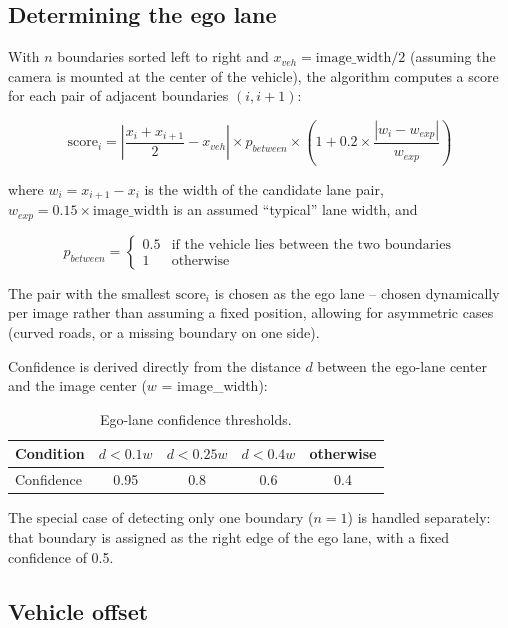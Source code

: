 \documentclass[12pt,a4paper]{report}
\begin{document}
\subsection{Determining the ego lane}

With $n$ boundaries sorted left to right and $x_{veh} = \text{image\_width}/2$ (assuming the camera is mounted at the center of the vehicle), the algorithm computes a score for each pair of adjacent boundaries $(i, i+1)$:

\[
\text{score}_i = \left| \frac{x_i + x_{i+1}}{2} - x_{veh} \right| \times p_{between} \times \left(1 + 0.2 \times \frac{|w_i - w_{exp}|}{w_{exp}}\right)
\]

where $w_i = x_{i+1} - x_i$ is the width of the candidate lane pair, $w_{exp} = 0.15 \times \text{image\_width}$ is an assumed ``typical'' lane width, and

\[
p_{between} =
\begin{cases}
0.5 & \text{if the vehicle lies between the two boundaries} \\
1   & \text{otherwise}
\end{cases}
\]

The pair with the smallest $\text{score}_i$ is chosen as the ego lane -- chosen dynamically per image rather than assuming a fixed position, allowing for asymmetric cases (curved roads, or a missing boundary on one side).

Confidence is derived directly from the distance $d$ between the ego-lane center and the image center ($w$ = image\_width):

\begin{table}[htbp]
    \centering
    \small
    \caption{Ego-lane confidence thresholds.}
    \label{tab:ego-confidence}
    \begin{tabular}{@{}lcccc@{}}
        \toprule
        Condition   & $d < 0.1w$ & $d < 0.25w$ & $d < 0.4w$ & otherwise \\
        \midrule
        Confidence  & 0.95       & 0.8         & 0.6        & 0.4 \\
        \bottomrule
    \end{tabular}
\end{table}

The special case of detecting only one boundary ($n=1$) is handled separately: that boundary is assigned as the right edge of the ego lane, with a fixed confidence of 0.5.

\subsection{Vehicle offset}
\end{document}
